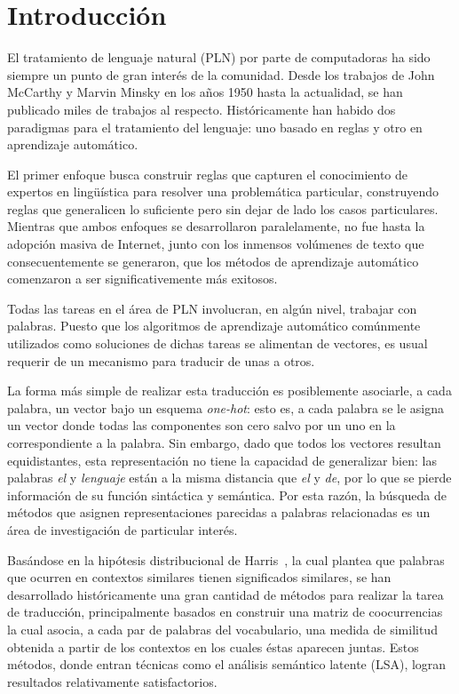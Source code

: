 \chapter{Introducción}

El tratamiento de lenguaje natural (PLN) por parte de computadoras ha sido siempre un punto de gran
interés de la comunidad. Desde los trabajos de John McCarthy y Marvin Minsky en los años 1950 hasta
la actualidad, se han publicado miles de trabajos al respecto. Históricamente han habido dos
paradigmas para el tratamiento del lenguaje: uno basado en reglas y otro en aprendizaje automático.

El primer enfoque busca construir reglas que capturen el conocimiento de expertos en lingüística
para resolver una problemática particular, construyendo reglas que generalicen lo suficiente pero
sin dejar de lado los casos particulares. Mientras que ambos enfoques se desarrollaron
paralelamente, no fue hasta la adopción masiva de Internet, junto con los inmensos volúmenes de
texto que consecuentemente se generaron, que los métodos de aprendizaje automático comenzaron a ser
significativemente más exitosos.

Todas las tareas en el área de PLN involucran, en algún nivel, trabajar con palabras. Puesto que los
algoritmos de aprendizaje automático comúnmente utilizados como soluciones de dichas tareas se
alimentan de vectores, es usual requerir de un mecanismo para traducir de unas a otros.

La forma más simple de realizar esta traducción es posiblemente asociarle, a cada palabra, un vector
bajo un esquema \textit{one-hot}: esto es, a cada palabra se le asigna un vector donde todas las
componentes son cero salvo por un uno en la correspondiente a la palabra. Sin embargo, dado que
todos los vectores resultan equidistantes, esta representación no tiene la capacidad de generalizar
bien: las palabras \textit{el} y \textit{lenguaje} están a la misma distancia que \textit{el} y
\textit{de}, por lo que se pierde información de su función sintáctica y semántica. Por esta razón,
la búsqueda de métodos que asignen representaciones parecidas a palabras relacionadas es un área de
investigación de particular interés.

Basándose en la hipótesis distribucional de Harris~\cite{Harris1954}, la cual plantea que palabras
que ocurren en contextos similares tienen significados similares, se han desarrollado históricamente
una gran cantidad de métodos para realizar la tarea de traducción, principalmente basados en
construir una matriz de coocurrencias la cual asocia, a cada par de palabras del vocabulario, una
medida de similitud obtenida a partir de los contextos en los cuales éstas aparecen juntas. Estos
métodos, donde entran técnicas como el análisis semántico latente (LSA), logran resultados
relativamente satisfactorios.

